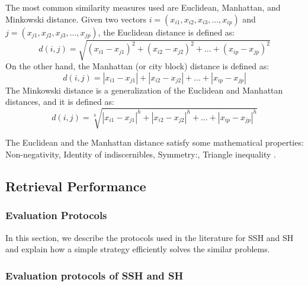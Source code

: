 \documentclass{article}
\begin{document}
The most common similarity measures used are Euclidean, Manhattan, and Minkowski distance. Given two vectors $i = (x_{i1}, x_{i2}, x_{i3}, ..., x_{ip})$ and $j = (x_{j1}, x_{j2}, x_{j3}, ..., x_{jp})$, the Euclidean distance is defined as:
\begin{equation}
d(i,j) = \sqrt{(x_{i1}-x_{j1})^2+(x_{i2}-x_{j2})^2+...+(x_{ip}-x_{jp})^2}
\end{equation}
On the other hand, the Manhattan (or city block) distance is defined as:
\begin{equation}
d(i,j) = \left |x_{i1}-x_{j1}\right |+\left |x_{i2}-x_{j2}\right |+...+\left |x_{ip}-x_{jp}\right | 
\end{equation}
The Minkowski distance is a generalization of the Euclidean and Manhattan distances, and it is defined as:
\begin{equation}
d(i,j) = \sqrt[h]{\left |x_{i1}-x_{j1}\right |^h+\left |x_{i2}-x_{j2}\right |^h+...+\left |x_{ip}-x_{jp}\right | ^h }
\end{equation}

The Euclidean and the Manhattan distance satisfy some mathematical properties: Non-negativity, Identity of indiscernibles, Symmetry:, Triangle inequality \cite{han2011data}.

\subsection{Retrieval Performance} %


\subsubsection{Evaluation Protocols} %

 

In this section, we describe the protocols used in the literature for SSH and SH and explain how a simple strategy efficiently solves the similar problems.

\subsubsection*{Evaluation protocols of SSH and SH}
\end{document}
